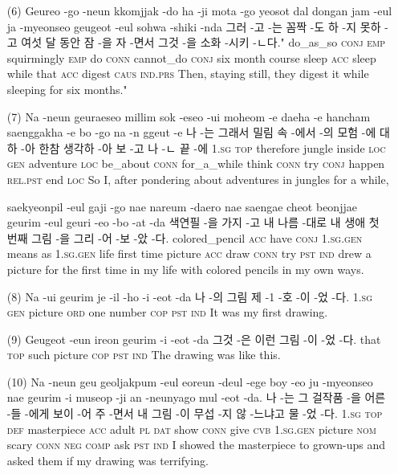 \begin{itemize}
\item [(6)]
\tgl
		{Geureo -go -neun kkomjjak -do ha -ji mota -go yeosot dal dongan jam -eul ja -myeonseo geugeot -eul sohwa -shiki -nda}
		{그러 -고 -는 꼼짝 -도 하 -지 못하 -고 여섯 달 동안 잠 -을 자 -면서 그것 -을 소화 -시키 -ㄴ다."}
		{do\_as\_so \textsc{conj} \textsc{emp} squirmingly \textsc{emp} do \textsc{conn} cannot\_do \textsc{conj} six month course sleep \textsc{acc} sleep while that \textsc{acc} digest \textsc{caus} \textsc{ind.prs}}
		{Then, staying still, they digest it while sleeping for six months."}

\item [(7)]
\tgl
		{Na -neun geuraeseo millim sok -eseo -ui moheom -e daeha -e hancham saenggakha -e bo -go na -n ggeut -e}
		{나 -는 그래서 밀림 속 -에서 -의 모험 -에 대하 -아 한참 생각하 -아 보 -고 나 -ㄴ 끝 -에}
		{\textsc{1.sg} \textsc{top} therefore jungle inside \textsc{loc} \textsc{gen} adventure \textsc{loc} be\_about \textsc{conn} for\_a\_while think \textsc{conn} try \textsc{conj} happen \textsc{rel.pst} end \textsc{loc}}
		{So I, after pondering about adventures in jungles for a while,}
		
\tgl
		{saekyeonpil -eul gaji -go nae nareum -daero nae saengae cheot beonjjae geurim -eul geuri -eo -bo -at -da}
		{색연필 -을 가지 -고 내 나름 -대로 내 생애 첫 번째 그림 -을 그리 -어 -보 -았 -다.}
		{colored\_pencil \textsc{acc} have \textsc{conj} \textsc{1.sg.gen} means as \textsc{1.sg.gen} life first time picture \textsc{acc} draw \textsc{conn} try \textsc{pst} \textsc{ind}}
		{drew a picture for the first time in my life with colored pencils in my own ways.}

\item [(8)]
\tgl
		{Na -ui geurim je -il -ho -i -eot -da}
		{나 -의 그림 제 -1 -호 -이 -었 -다.}
		{\textsc{1.sg} \textsc{gen} picture \textsc{ord} one number \textsc{cop} \textsc{pst} \textsc{ind}}
		{It was my first drawing.}

\item [(9)]
\tgl
		{Geugeot -eun ireon geurim -i -eot -da}
		{그것 -은 이런 그림 -이 -었 -다.}
		{that \textsc{top} such picture \textsc{cop} \textsc{pst} \textsc{ind}}
		{The drawing was like this.}

\item [(10)]
\tgl
		{Na -neun geu geoljakpum -eul eoreun -deul -ege boy -eo ju -myeonseo nae geurim -i museop -ji an -neunyago mul -eot -da.}
		{나 -는 그 걸작품 -을 어른 -들 -에게 보이 -어 주 -면서 내 그림 -이 무섭 -지 않 -느냐고 물 -었 -다.}
		{\textsc{1.sg} \textsc{top} \textsc{def} masterpiece \textsc{acc} adult \textsc{pl} \textsc{dat} show \textsc{conn} give \textsc{cvb} \textsc{1.sg.gen} picture \textsc{nom} scary \textsc{conn} \textsc{neg} \textsc{comp} ask \textsc{pst} \textsc{ind}}
		{I showed the masterpiece to grown-ups and asked them if my drawing was terrifying.}


\end{itemize}
